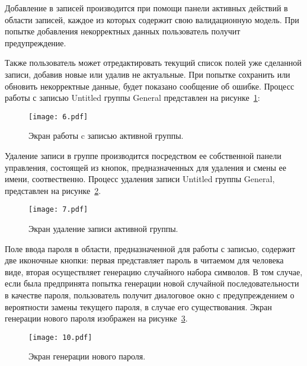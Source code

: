 Добавление в записей производится при помощи панели активных действий в области записей, каждое из которых содержит свою валидационную модель. При попытке добавления некорректных данных пользователь получит предупреждение.

Также пользователь может отредактировать текущий список полей уже сделанной записи, добавив новые или удалив не актуальные. При попытке сохранить или обновить некорректные данные, будет показано сообщение об ошибке. Процесс работы с записью Untitled группы General представлен на рисунке~\ref{fig:document:created_entry:six}:

\begin{figure}[ht]
\centering
  \texttt{[image: 6.pdf]}
  \caption{ Экран работы c записью активной группы. }
  \label{fig:document:created_entry:six}
\end{figure}

Удаление записи в группе производится посредством ее собственной панели управления, состоящей из кнопок, предназначенных для удаления и смены ее имени, соотвественно. Процесс удаления записи Untitled группы General, представлен на рисунке~\ref{fig:document:created_entry:seven}.

\begin{figure}[ht]
\centering
  \texttt{[image: 7.pdf]}
  \caption{ Экран удаление записи активной группы. }
  \label{fig:document:created_entry:seven}
\end{figure}

\newpage

Поле ввода пароля в области, предназначенной для работы с записью, содержит две иконочные кнопки: первая представляет пароль в читаемом для человека виде, вторая осуществляет генерацию случайного набора символов. В том случае, если была предпринята попытка генерации новой случайной последовательности в качестве пароля, пользователь получит диалоговое окно с предупреждением о вероятности замены текущего пароля, в случае его существования. Экран генерации нового пароля изображен на рисунке~\ref{fig:document:created_entry:ten}.

\begin{figure}[ht]
\centering
  \texttt{[image: 10.pdf]}
  \caption{ Экран генерации нового пароля. }
  \label{fig:document:created_entry:ten}
\end{figure}